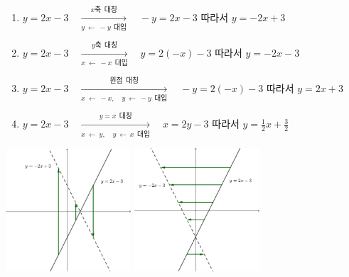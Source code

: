 \documentclass{oblivoir}
\begin{document}
\begin{mdframed}
\begin{enumerate}[itemsep=20pt]
\item
\(y=2x-3\quad\xrightarrow[y\:\leftarrow\: -y\:\:대입]{x축\:\:대칭}\quad-y=2x-3\)\qquad
따라서 \(y=-2x+3\)
\item
\(y=2x-3\quad\xrightarrow[x\:\leftarrow\: -x\:\:대입]{y축\:\:대칭}\quad y=2(-x)-3\)\qquad
따라서 \(y=-2x-3\)
\item
\(y=2x-3\quad\xrightarrow[x\:\leftarrow\: -x,\quad y\:\leftarrow\: -y\:\:대입]{원점\:\:대칭}\quad
-y=2(-x)-3\)\qquad
따라서 \(y=2x+3\)
\item
\(y=2x-3\quad\xrightarrow[x\:\leftarrow\: y,\quad y\:\leftarrow\: x\:\:대입]{y=x\:\:대칭}\quad
x=2y-3\)\qquad
따라서 \(y=\frac12x+\frac32\)
\end{enumerate}
\end{mdframed}
\bigskip
\begin{center}
\includegraphics[width=0.35\textwidth]{rreflect_4-1}\quad
\includegraphics[width=0.35\textwidth]{rreflect_4-2}\\
\end{center}
\end{document}
